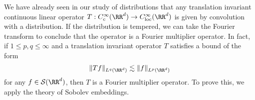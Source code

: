 We have already seen in our study of distributions that any translation invariant continuous linear operator $T: C_c^\infty(\RR^d) \to C^\infty_{\text{loc}}(\RR^d)$ is given by convolution with a distribution. If the distribution is tempered, we can take the Fourier transform to conclude that the operator is a Fourier multiplier operator. In fact, if $1 \leq p,q \leq \infty$ and a translation invariant operator $T$ satisfies a bound of the form
%
\[ \| Tf \|_{L^q(\RR^d)} \lesssim \| f \|_{L^p(\RR^d)} \]
%
for any $f \in \mathcal{S}(\RR^d)$, then $T$ is a Fourier multiplier operator. To prove this, we apply the theory of Sobolev embeddings.



